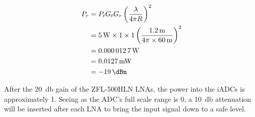 \begin{align}
  P_r &= P_t G_t G_r \left( \frac{\lambda}{4 \pi R} \right)^2 \\
      &= \SI{5}{\watt} \times 1 \times 1 \left( \frac{\SI{1.2}{\meter}}{4 \pi \times \SI{60}{\meter}} \right)^2 \\
      &= \SI{0.0000127}{\watt} \\
      &= \SI{0.0127}{\milli\watt} \\
     &= \SI{-19}{\dBm}
\end{align}

After the \SI{20}{\decibel} gain of the ZFL-500HLN LNAs, the power into the iADCs is approximately \SI{1}{\dBm}. Seeing as the ADC's full scale range is \SI{0}{\dBm}, a \SI{10}{\decibel} attenuation will be inserted after each LNA to bring the input signal down to a safe level.
